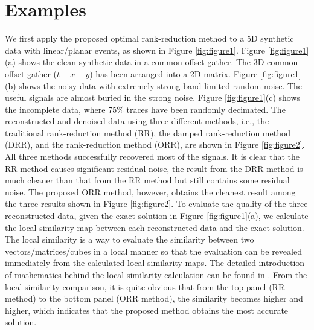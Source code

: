 \section{Examples}
We first apply the proposed optimal rank-reduction method to a 5D synthetic data with linear/planar events, as shown in Figure \ref{fig:figure1}. Figure \ref{fig:figure1}(a) shows the clean synthetic data in a common offset gather. The 3D common offset gather ($t-x-y$) has been arranged into a 2D matrix. Figure \ref{fig:figure1}(b) shows the noisy data with extremely strong band-limited random noise. The useful signals are almost buried in the strong noise. Figure \ref{fig:figure1}(c) shows the incomplete data, where 75\% traces have been randomly decimated. The reconstructed and denoised data using three different methods, i.e., the traditional rank-reduction method (RR), the damped rank-reduction method (DRR), and the  rank-reduction method (ORR), are shown in Figure \ref{fig:figure2}. All three methods successfully recovered most of the signals.  It is clear that the RR method causes significant residual noise, the result from the DRR method is much cleaner than that from the RR method but still contains some residual noise. The proposed ORR method, however, obtains the cleanest result among the three results shown in Figure \ref{fig:figure2}. To evaluate the quality of the three reconstructed data, given the exact solution in Figure \ref{fig:figure1}(a), we calculate the local similarity map between each reconstructed data and the exact solution. The local similarity is a way to evaluate the similarity between two vectors/matrices/cubes in a local manner so that the evaluation can be revealed immediately from the calculated local similarity maps. The detailed introduction of mathematics behind the local similarity calculation can be found in \cite{yangkang2015ortho}. From the local similarity comparison, it is quite obvious that from the top panel (RR method) to the bottom panel (ORR method), the similarity becomes higher and higher, which indicates that the proposed method obtains the most accurate solution.


